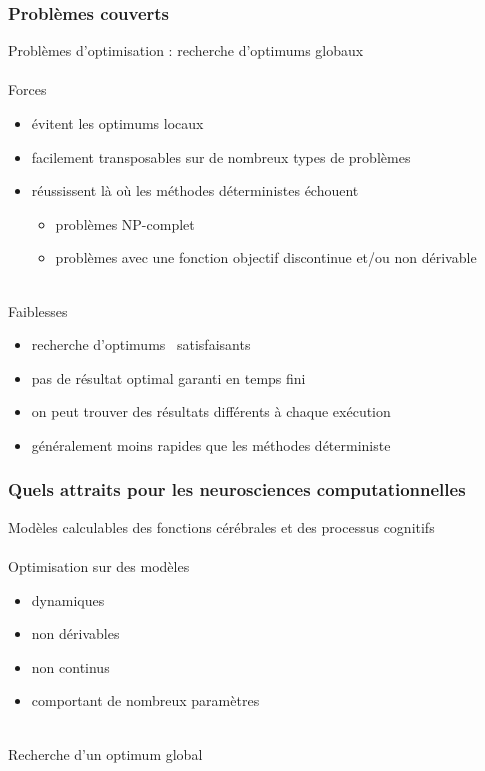 \documentclass{beamer}
\begin{document}
\begin{frame}
\frametitle{Problèmes couverts}
Problèmes d'optimisation : recherche d'optimums globaux\\
~\\
Forces
\begin{itemize}
	\item évitent les optimums locaux                                                  %
	\item facilement transposables sur de nombreux types de problèmes                 %
	\item réussissent là où les méthodes déterministes échouent
    \begin{itemize}
        \item problèmes NP-complet
        \item problèmes avec une fonction objectif discontinue et/ou non dérivable
    \end{itemize}
\end{itemize}
~\\
Faiblesses
\begin{itemize}
	\item recherche d'optimums \og~satisfaisants~\fg                                 %
	\item pas de résultat optimal garanti en temps fini                             %
	\item on peut trouver des résultats différents à chaque exécution               %
	\item généralement moins rapides que les méthodes déterministe
\end{itemize}
\end{frame}


\begin{frame}
\frametitle{Quels attraits pour les neurosciences computationnelles}
Modèles calculables des fonctions cérébrales et des processus cognitifs\\
~\\
Optimisation sur des modèles
\begin{itemize}
	\item dynamiques
	\item non dérivables
	\item non continus
    \item comportant de nombreux paramètres
\end{itemize}
~\\
Recherche d'un optimum global
\end{frame}
\end{document}
